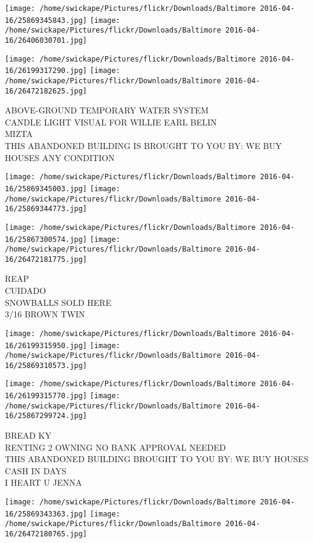 \documentclass[10pt,letterpaper]{article}
\begin{document}
\texttt{[image: /home/swickape/Pictures/flickr/Downloads/Baltimore 2016-04-16/25869345843.jpg]}
\texttt{[image: /home/swickape/Pictures/flickr/Downloads/Baltimore 2016-04-16/26406030701.jpg]}

\texttt{[image: /home/swickape/Pictures/flickr/Downloads/Baltimore 2016-04-16/26199317290.jpg]}
\texttt{[image: /home/swickape/Pictures/flickr/Downloads/Baltimore 2016-04-16/26472182625.jpg]}

ABOVE{-}GROUND TEMPORARY WATER SYSTEM\\
CANDLE LIGHT VISUAL FOR WILLIE EARL BELIN\\
MIZTA\\
THIS ABANDONED BUILDING IS BROUGHT TO YOU BY: WE BUY HOUSES ANY CONDITION
\pagebreak

\texttt{[image: /home/swickape/Pictures/flickr/Downloads/Baltimore 2016-04-16/25869345003.jpg]}
\texttt{[image: /home/swickape/Pictures/flickr/Downloads/Baltimore 2016-04-16/25869344773.jpg]}

\texttt{[image: /home/swickape/Pictures/flickr/Downloads/Baltimore 2016-04-16/25867300574.jpg]}
\texttt{[image: /home/swickape/Pictures/flickr/Downloads/Baltimore 2016-04-16/26472181775.jpg]}

REAP\\
CUIDADO\\
SNOWBALLS SOLD HERE\\
3/16 BROWN TWIN
\pagebreak

\texttt{[image: /home/swickape/Pictures/flickr/Downloads/Baltimore 2016-04-16/26199315950.jpg]}
\texttt{[image: /home/swickape/Pictures/flickr/Downloads/Baltimore 2016-04-16/25869310573.jpg]}

\texttt{[image: /home/swickape/Pictures/flickr/Downloads/Baltimore 2016-04-16/26199315770.jpg]}
\texttt{[image: /home/swickape/Pictures/flickr/Downloads/Baltimore 2016-04-16/25867299724.jpg]}

BREAD KY\\
RENTING 2 OWNING NO BANK APPROVAL NEEDED\\
THIS ABANDONED BUILDING BROUGHT TO YOU BY: WE BUY HOUSES CASH IN DAYS\\
I HEART U JENNA
\pagebreak

\texttt{[image: /home/swickape/Pictures/flickr/Downloads/Baltimore 2016-04-16/25869343363.jpg]}
\texttt{[image: /home/swickape/Pictures/flickr/Downloads/Baltimore 2016-04-16/26472180765.jpg]}
\end{document}
